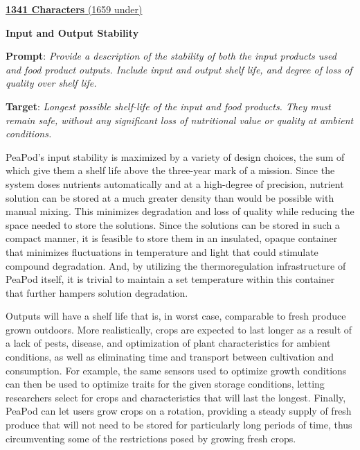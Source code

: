 \documentclass{report}
\begin{document}
\uline{\textbf{1341 Characters} (1659 under)}


\textbf{Input and Output Stability}
\label{sec:reliability-inputoutput}

\textbf{Prompt}: \textit{Provide a description of the stability of both the input products used and food product outputs. Include input and output shelf life, and degree of loss of quality over shelf life.}

\textbf{Target}: \textit{Longest possible shelf-life of the input and food products. They must remain safe, without any significant loss of nutritional value or quality at ambient conditions.}


PeaPod's input stability is maximized by a variety of design choices, the sum of which give them a shelf life above the three-year mark of a mission. Since the system doses nutrients automatically and at a high-degree of precision, nutrient solution can be stored at a much greater density than would be possible with manual mixing. This minimizes degradation and loss of quality while reducing the space needed to store the solutions. Since the solutions can be stored in such a compact manner, it is feasible to store them in an insulated, opaque container that minimizes fluctuations in temperature and light that could stimulate compound degradation. And, by utilizing the thermoregulation infrastructure of PeaPod itself, it is trivial to maintain a set temperature within this container that further hampers solution degradation.

Outputs will have a shelf life that is, in worst case, comparable to fresh produce grown outdoors. More realistically, crops are expected to last longer as a result of a lack of pests, disease, and optimization of plant characteristics for ambient conditions, as well as eliminating time and transport between cultivation and consumption. For example, the same sensors used to optimize growth conditions can then be used to optimize traits for the given storage conditions, letting researchers select for crops and characteristics that will last the longest. Finally, PeaPod can let users grow crops on a rotation, providing a steady supply of fresh produce that will not need to be stored for particularly long periods of time, thus circumventing some of the restrictions posed by growing fresh crops.
\end{document}
